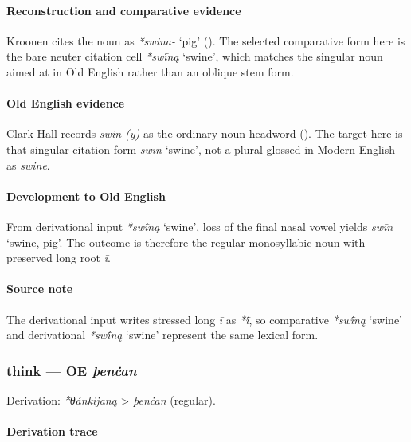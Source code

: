 \documentclass[
  british,
  a4paper,
]{article}
\providecommand{\Recon}[1]{\emph{*#1}}
\begin{document}
\paragraph{Reconstruction and comparative
evidence}\label{reconstruction-and-comparative-evidence-58}

Kroonen cites the noun as \emph{*swina-} `pig'
(). The selected comparative
form here is the bare neuter citation cell \Recon{swī́ną} `swine', which
matches the singular noun aimed at in Old English rather than an oblique
stem form.

\paragraph{Old English evidence}\label{old-english-evidence-58}

Clark Hall records \emph{swin (y)} as the ordinary noun headword
(). The target here is that
singular citation form \emph{swīn} `swine', not a plural glossed in
Modern English as \emph{swine}.

\paragraph{Development to Old
English}\label{development-to-old-english-58}

From derivational input \Recon{swī́ną} `swine', loss of the final nasal
vowel yields {\emph{swīn}} `swine, pig'. The outcome is therefore the
regular monosyllabic noun with preserved long root \emph{ī}.

\paragraph{Source note}\label{source-note-4}

The derivational input writes stressed long \emph{ī} as \emph{*ī́}, so
comparative \Recon{swī́ną} `swine' and derivational \Recon{swī́ną} `swine'
represent the same lexical form.

\subsubsection{\texorpdfstring{think --- OE
\emph{þenċan}}{think --- OE þenċan}}\label{think-oe-uxfeenux10ban}

Derivation: \emph{*θánkijaną} \textgreater{} \emph{þenċan} (regular).

\paragraph{Derivation trace}\label{derivation-trace-63}
\end{document}
